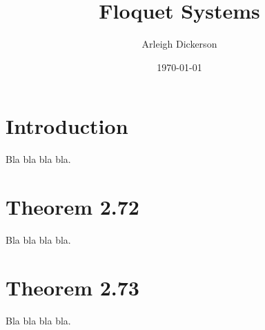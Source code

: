 \documentclass[a4paper]{article}
\title{Floquet Systems}
\author{Arleigh Dickerson}
\date{\today}
\begin{document}
\maketitle

\section{Introduction}

Bla bla bla bla.

\section{Theorem 2.72}

Bla bla bla bla.

\section{Theorem 2.73}

Bla bla bla bla.
\end{document}
